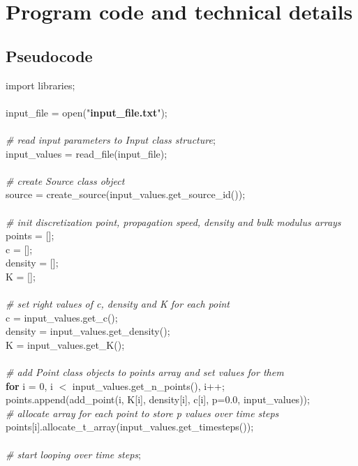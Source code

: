 \documentclass[]{article}
\begin{document}
\section{Program code and technical details}

\subsection{Pseudocode}
import libraries; \\
\\
input\_file = open("\textbf{input\_file.txt}"); \\
\\
\textit{\# read input parameters to Input class structure}; \\
input\_values = read\_file(input\_file); \\
\\
\textit{\# create Source class object} \\
source = create\_source(input\_values.get\_source\_id()); \\
\\
\textit{\# init discretization point, propagation speed, density and bulk modulus arrays} \\
points = []; \\
c = []; \\
density = []; \\
K = []; \\
\\
\textit{\# set right values of c, density and K for each point} \\
c = input\_values.get\_c(); \\
density = input\_values.get\_density(); \\
K = input\_values.get\_K(); \\
\\
\textit{\# add Point class objects to points array and set values for them} \\
\textbf{for} i = 0, i $<$ input\_values.get\_n\_points(), i++; \\
\indent points.append(add\_point(i, K[i], density[i], c[i], p=0.0, input\_values)); \\
\indent \textit{\# allocate array for each point to store p values over time steps} \\
\indent points[i].allocate\_t\_array(input\_values.get\_timesteps()); \\
\\
\textit{\# start looping over time steps}; \\
\end{document}
